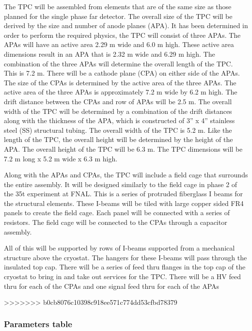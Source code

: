 The TPC will be assembled from elements that are of the same size as those planned for the single phase 
far detector.  The overall size of the TPC will be derived by the size and number of anode planes (APA).  It 
has been determined in order to perform the required physics, the TPC will consist of three APAs.  The 
APAs will have an active area 2.29 m wide and 6.0 m high.  These active area dimensions result in an APA 
that is 2.32 m wide and 6.29 m high.  The combination of the three APAs will determine the overall length 
of the TPC.  This is 7.2 m.  There will be a cathode plane (CPA) on either side of the APAs.  The size of the 
CPAs is determined by the active area of the three APAs.  The active area of the three APAs is 
approximately 7.2 m wide by 6.2 m high.  The drift distance between the CPAs and row of APAs will be 2.5 
m.  The overall width of the TPC will be determined by a combination of the drift distances along with the 
thickness of the APA, which is constructed of 3” x 4” stainless steel (SS) structural tubing.  The overall 
width of the TPC is 5.2 m.  Like the length of the TPC, the overall height will be determined by the height 
of the APA.  The overall height of the TPC will be 6.3 m.  The TPC dimensions will be 7.2 m long x 5.2 m 
wide x 6.3 m high.

Along with the APAs and CPAs, the TPC will include a field cage that surrounds the entire assembly.  It will 
be designed similarly to the field cage in phase 2 of the 35t experiment at FNAL.  This is a series of 
protruded fiberglass I beams for the structural elements.  These I-beams will be tiled with large copper 
sided FR4 panels to create the field cage.  Each panel will be connected with a series of resistors.  The field 
cage will be connected to the CPAs through a capacitor assembly.

All of this will be supported by rows of I-beams supported from a mechanical structure above the cryostat.  
The hangers for these I-beams will pass through the insulated top cap.  There will be a series of feed thru 
flanges in the top cap of the cryostat to bring in and take out services for the TPC.  There will be a HV feed 
thru for each of the CPAs and one signal feed thru for each of the APAs

>>>>>>> b0cb8076c10398c918ee571c774dd53cfbd78379


\subsubsection{Parameters table}
